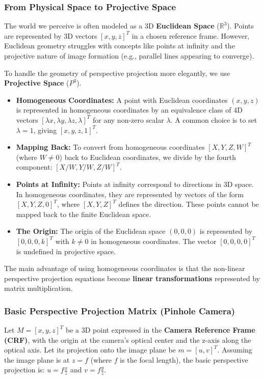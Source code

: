 \subsubsection{From Physical Space to Projective Space}

The world we perceive is often modeled as a 3D \textbf{Euclidean Space} ($\mathbb{R}^3$). Points are represented by 3D vectors $[x, y, z]^T$ in a chosen reference frame. However, Euclidean geometry struggles with concepts like points at infinity and the projective nature of image formation (e.g., parallel lines appearing to converge).

To handle the geometry of perspective projection more elegantly, we use \textbf{Projective Space} ($P^3$).
\begin{itemize}
    \item \textbf{Homogeneous Coordinates:} A point with Euclidean coordinates $(x, y, z)$ is represented in homogeneous coordinates by an equivalence class of 4D vectors $[\lambda x, \lambda y, \lambda z, \lambda]^T$ for any non-zero scalar $\lambda$. A common choice is to set $\lambda=1$, giving $[x, y, z, 1]^T$.
    \item \textbf{Mapping Back:} To convert from homogeneous coordinates $[X, Y, Z, W]^T$ (where $W \neq 0$) back to Euclidean coordinates, we divide by the fourth component: $[X/W, Y/W, Z/W]^T$.
    \item \textbf{Points at Infinity:} Points at infinity correspond to directions in 3D space. In homogeneous coordinates, they are represented by vectors of the form $[X, Y, Z, 0]^T$, where $[X, Y, Z]^T$ defines the direction. These points cannot be mapped back to the finite Euclidean space.
    \item \textbf{The Origin:} The origin of the Euclidean space $(0,0,0)$ is represented by $[0, 0, 0, k]^T$ with $k \neq 0$ in homogeneous coordinates. The vector $[0, 0, 0, 0]^T$ is undefined in projective space.
\end{itemize}
The main advantage of using homogeneous coordinates is that the non-linear perspective projection equations become \textbf{linear transformations} represented by matrix multiplication.

\subsubsection{Basic Perspective Projection Matrix (Pinhole Camera)}

Let $M = [x, y, z]^T$ be a 3D point expressed in the \textbf{Camera Reference Frame (CRF)}, with the origin at the camera's optical center and the z-axis along the optical axis. Let its projection onto the image plane be $m = [u, v]^T$. Assuming the image plane is at $z=f$ (where $f$ is the focal length), the basic perspective projection is:
$u = f \frac{x}{z}$ and $v = f \frac{y}{z}$.

